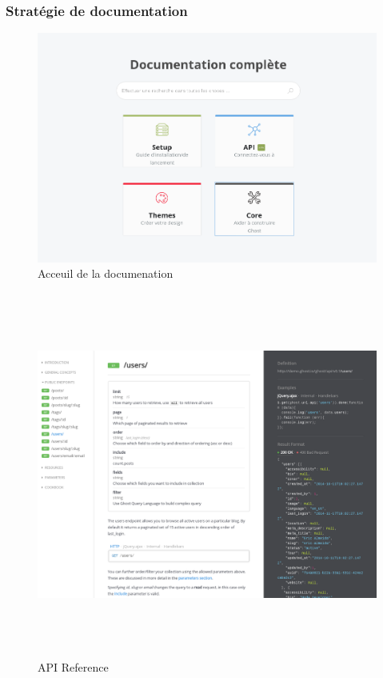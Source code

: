    \subsubsection{Stratégie de documentation}
        \begin{figure}[h]
            \centering
            \includegraphics[scale=0.35]{./assets/ghost1.png}
            \caption{Acceuil de la documenation}
        \end{figure}

        \newpage
        \begin{figure}[h]
            \centering
            \includegraphics[height=12cm]{./assets/ghost2.png}
            \caption{API Reference}
        \end{figure}

